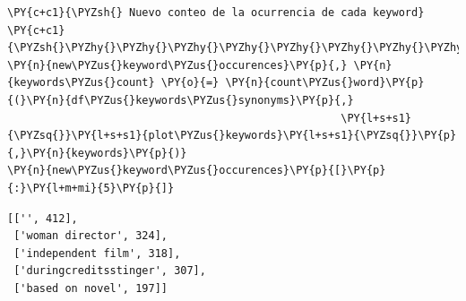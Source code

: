     \begin{tcolorbox}[breakable, size=fbox, boxrule=1pt, pad at break*=1mm,colback=cellbackground, colframe=cellborder]
\begin{Verbatim}[commandchars=\\\{\}]
\PY{c+c1}{\PYZsh{} Nuevo conteo de la ocurrencia de cada keyword}
\PY{c+c1}{\PYZsh{}\PYZhy{}\PYZhy{}\PYZhy{}\PYZhy{}\PYZhy{}\PYZhy{}\PYZhy{}\PYZhy{}\PYZhy{}\PYZhy{}\PYZhy{}\PYZhy{}\PYZhy{}\PYZhy{}\PYZhy{}\PYZhy{}\PYZhy{}\PYZhy{}\PYZhy{}\PYZhy{}\PYZhy{}\PYZhy{}\PYZhy{}\PYZhy{}\PYZhy{}\PYZhy{}\PYZhy{}\PYZhy{}\PYZhy{}\PYZhy{}\PYZhy{}\PYZhy{}\PYZhy{}\PYZhy{}\PYZhy{}\PYZhy{}\PYZhy{}}
\PY{n}{new\PYZus{}keyword\PYZus{}occurences}\PY{p}{,} \PY{n}{keywords\PYZus{}count} \PY{o}{=} \PY{n}{count\PYZus{}word}\PY{p}{(}\PY{n}{df\PYZus{}keywords\PYZus{}synonyms}\PY{p}{,}
                                                    \PY{l+s+s1}{\PYZsq{}}\PY{l+s+s1}{plot\PYZus{}keywords}\PY{l+s+s1}{\PYZsq{}}\PY{p}{,}\PY{n}{keywords}\PY{p}{)}
\PY{n}{new\PYZus{}keyword\PYZus{}occurences}\PY{p}{[}\PY{p}{:}\PY{l+m+mi}{5}\PY{p}{]}
\end{Verbatim}
\end{tcolorbox}

            \begin{tcolorbox}[breakable, boxrule=.5pt, size=fbox, pad at break*=1mm, opacityfill=0]
\begin{Verbatim}[commandchars=\\\{\}]
[['', 412],
 ['woman director', 324],
 ['independent film', 318],
 ['duringcreditsstinger', 307],
 ['based on novel', 197]]
\end{Verbatim}
\end{tcolorbox}
        

